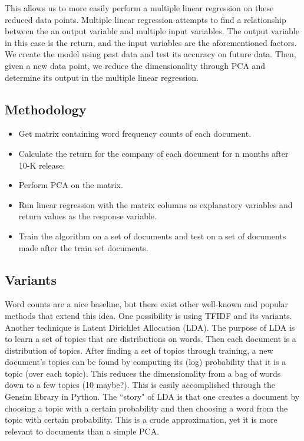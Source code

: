 \documentclass[12pt]{article}
\begin{document}
This allows us to more easily perform a multiple linear regression on these reduced data points. Multiple linear regression attempts to find a relationship between the an output variable and multiple input variables. The output variable in this case is the return, and the input variables are the aforementioned factors. We create the model using past data and test its accuracy on future data. Then, given a new data point, we reduce the dimensionality through PCA and determine its output in the multiple linear regression. 


\subsection{Methodology}

	\begin{itemize}
		\item Get matrix containing word frequency counts of each document.
		\item Calculate the return for the company of each document for n months after 10-K release. 
		\item Perform PCA on the matrix. 
		\item Run linear regression with the matrix columns as explanatory variables and return values as the response variable.
		\item Train the algorithm on a set of documents and test on a set of documents made after the train set documents. 
	\end{itemize}	

\subsection{Variants}

Word counts are a nice baseline, but there exist other well-known and popular methods that extend this idea. One possibility is using TFIDF and its variants. Another technique is Latent Dirichlet Allocation (LDA). The purpose of LDA is to learn a set of topics that are distributions on words. Then each document is a distribution of topics. After finding a set of topics through training, a new document's topics can be found by computing its (log) probability that it is a topic (over each topic). This reduces the dimensionality from a bag of words down to a few topics (10 maybe?). This is easily accomplished through the Gensim library in Python. The ``story" of LDA is that one creates a document by choosing a topic with a certain probability and then choosing a word from the topic with certain probability. This is a crude approximation, yet it is more relevant to documents than a simple PCA.
\end{document}
